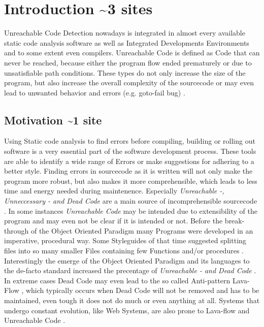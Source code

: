 
\chapter{Introduction \textasciitilde 3 sites}
\label{cha:introduction}

Unreachable Code Detection nowadays is integrated in almost every available static code analysis software as well as Integrated Developments Environments and to some extent even compilers.
Unreachable Code is defined as Code that can never be reached, because either the program flow ended prematurely or due to unsatisfiable path conditions.
These types do not only increase the size of the program, but also increase the overall complexity of the sourcecode or may even lead to unwanted behavior and errors (e.g. goto-fail bug) \cite{Boyes_2014}.

\section{Motivation  \textasciitilde 1 site}
Using Static code analysis to find errors before compiling, building or rolling out software is a very essential part of the software development process.
These tools are able to identify a wide range of Errors or make suggestions for adhering to a better style.
Finding errors in sourcecode as it is written will not only make the program more robust, but also makes it more comprehensible, which leads to less time and energy needed during maintenence.
Especially \emph{Unreachable -, Unneccessary - and Dead Code} are a main source of incomprehensible sourcecode \cite{Romano_2020}.
In some instances \emph{Unreachable Code} may be intended due to extensibility of the program \cite{Haas_2020} and may even not be clear if it is intended or not.
Before the break-through of the Object Oriented Paradigm many Programs were developed in an imperative, procedural way. Some Styleguides of that time suggested splitting files into so many smaller Files containing few Functions and/or procedures \cite{Srivastava_1992}.
Interestingly the emerge of the Object Oriented Paradigm and its languages to the de-facto standard increased the precentage of \emph{Unreachable - and Dead Code} \cite{Srivastava_1992}.
In extreme cases Dead Code may even lead to the so called Anti-pattern Lava-Flow \cite{Romano_2020}, which typically occurs when Dead Code will not be removed and has to be maintained, even tough it does not do much or even anything at all.
Systems that undergo constant evolution, like Web Systems, are also prone to Lava-flow and Unreachable Code \cite{Boomsma_2012}.

